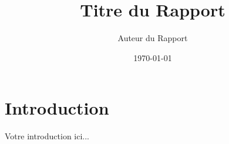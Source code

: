 \documentclass{report}
\title{Titre du Rapport}
\author{Auteur du Rapport}
\date{\today}
\begin{document}
\maketitle

\section{Introduction}
Votre introduction ici...
\end{document}
